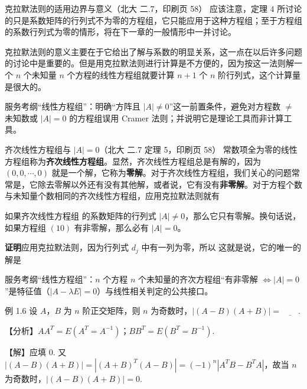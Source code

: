 \begin{fdeep}{克拉默法则的适用边界与意义（北大 二.7，印刷页 58）}
应该注意，定理 $4$ 所讨论的只是系数矩阵的行列式不为零的方程组，它只能应用于这种方程组；至于方程组的系数行列式为零的情形，将在下一章的一般情形中一并讨论。

克拉默法则的意义主要在于它给出了解与系数的明显关系，这一点在以后许多问题的讨论中是重要的。但是用克拉默法则进行计算是不方便的，因为按这一法则解一个 $n$ 个未知量 $n$ 个方程的线性方程组就要计算 $n+1$ 个 $n$ 阶行列式，这个计算量是很大的。

\fbref{}服务考纲“线性方程组”：明确“方阵且 $|A|\ne 0$”这一前置条件，避免对方程数 $\ne$ 未知数或 $|A|=0$ 的方程组误用 Cramer 法则；并说明它是理论工具而非计算工具。
\end{fdeep}

\begin{fdeep}{齐次线性方程组与 $|A|=0$（北大 二.7 定理 5，印刷页 58）}
常数项全为零的线性方程组称为\textbf{齐次线性方程组}。显然，齐次线性方程组总是有解的，因为 $(0,0,\cdots,0)$ 就是一个解，它称为\textbf{零解}。对于齐次线性方程组，我们关心的问题常常是，它除去零解以外还有没有其他解，或者说，它有没有\textbf{非零解}。对于方程个数与未知量个数相同的齐次线性方程组，应用克拉默法则就有

\quad 如果齐次线性方程组
的系数矩阵的行列式 $|A|\ne 0$，那么它只有零解。换句话说，如果方程组 $(10)$ 有非零解，那么必有 $|A|=0$。

\textbf{证明}\quad 应用克拉默法则，因为行列式 $d_j$ 中有一列为零，所以
这就是说，它的唯一的解是

\fbref{}服务考纲“线性方程组”：$n$ 个方程 $n$ 个未知量的齐次方程组“有非零解 $\Leftrightarrow |A|=0$”是特征值（$|A-\lambda E|=0$）与线性相关判定的公共接口。
\end{fdeep}

\begin{fcard}{例 1.6}
设 $A$，$B$ 为 $n$ 阶正交矩阵，则 $n$ 为奇数时，$|(A-B)(A+B)|=\underline{\qquad}$.

【分析】$AA^{T}=E(A^{T}=A^{-1})$；$BB^{T}=E(B^{T}=B^{-1})$.

【解】应填 0.
又 $|(A-B)(A+B)|=|(A+B)^{T}(A-B)|=(-1)^{n}|A^{T}B-B^{T}A|$，故当 $n$ 为奇数时，$|(A-B)(A+B)|=0$.
\end{fcard}


